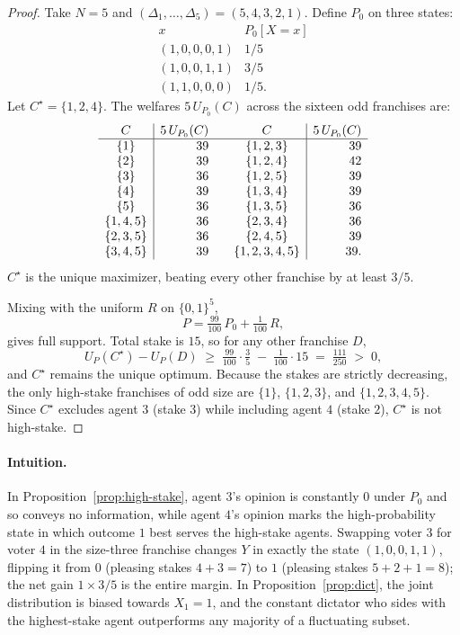 \documentclass{article}
\theoremstyle{plain}
\theoremstyle{definition}
\begin{document}
\begin{proof}
Take $N = 5$ and $(\Delta_1, \ldots, \Delta_5) = (5, 4, 3, 2, 1)$.  Define $P_0$ on three states:
\[
\begin{array}{c|c}
x & P_0[X = x] \\
\hline
(1,0,0,0,1) & 1/5 \\
(1,0,0,1,1) & 3/5 \\
(1,1,0,0,0) & 1/5 .
\end{array}
\]
Let $C^\star = \{1, 2, 4\}$.  The welfares $5\, U_{P_0}(C)$ across the sixteen odd franchises are:
\[
\begin{array}{c|r@{\qquad}c|r}
C & 5\, U_{P_0}(C) & C & 5\, U_{P_0}(C) \\
\hline
\{1\}         & 39 & \{1,2,3\}     & 39 \\
\{2\}         & 39 & \{1,2,4\}     & 42 \\
\{3\}         & 36 & \{1,2,5\}     & 39 \\
\{4\}         & 39 & \{1,3,4\}     & 39 \\
\{5\}         & 36 & \{1,3,5\}     & 36 \\
\{1,4,5\}     & 36 & \{2,3,4\}     & 36 \\
\{2,3,5\}     & 36 & \{2,4,5\}     & 39 \\
\{3,4,5\}     & 39 & \{1,2,3,4,5\} & 39 .
\end{array}
\]
$C^\star$ is the unique maximizer, beating every other franchise by at least $3/5$.

Mixing with the uniform $R$ on $\{0,1\}^5$,
\[
    P = \tfrac{99}{100}\, P_0 + \tfrac{1}{100}\, R ,
\]
gives full support.  Total stake is $15$, so for any other franchise $D$,
\[
    U_P(C^\star) - U_P(D) \;\geq\; \tfrac{99}{100}\cdot\tfrac{3}{5} \;-\; \tfrac{1}{100}\cdot 15 \;=\; \tfrac{111}{250} \;>\; 0,
\]
and $C^\star$ remains the unique optimum.  Because the stakes are strictly decreasing, the only high-stake franchises of odd size are $\{1\}$, $\{1,2,3\}$, and $\{1,2,3,4,5\}$.  Since $C^\star$ excludes agent $3$ (stake $3$) while including agent $4$ (stake $2$), $C^\star$ is not high-stake.
\end{proof}

\paragraph{Intuition.}
In Proposition~\ref{prop:high-stake}, agent $3$'s opinion is constantly $0$ under $P_0$ and so conveys no information, while agent $4$'s opinion marks the high-probability state in which outcome $1$ best serves the high-stake agents.  Swapping voter $3$ for voter $4$ in the size-three franchise changes $Y$ in exactly the state $(1,0,0,1,1)$, flipping it from $0$ (pleasing stakes $4+3 = 7$) to $1$ (pleasing stakes $5+2+1 = 8$); the net gain $1 \times 3/5$ is the entire margin.  In Proposition~\ref{prop:dict}, the joint distribution is biased towards $X_1 = 1$, and the constant dictator who sides with the highest-stake agent outperforms any majority of a fluctuating subset.
\end{document}
